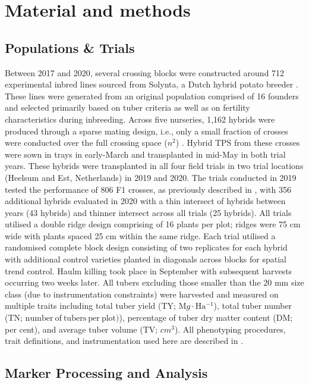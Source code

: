 \section{Material and methods}

\subsection{Populations \& Trials}

Between 2017 and 2020, several crossing blocks were constructed around 712 experimental inbred lines sourced from Solynta, a Dutch hybrid potato breeder \cite{Lindhout2018}. These lines were generated from an original population comprised of 16 founders and selected primarily based on tuber criteria as well as on fertility characteristics during inbreeding. Across five nurseries, 1,162 hybrids were produced through a sparse mating design, i.e., only a small fraction of crosses were conducted over the full crossing space (\(n^2\)) \cite{Wang2020}. Hybrid TPS from these crosses were sown in trays in early-March and transplanted in mid-May in both trial years. These hybrids were transplanted in all four field trials in two trial locations (Heelsum and Est, Netherlands) in 2019 and 2020. The trials conducted in 2019 tested the performance of 806 F1 crosses, as previously described in \cite{Adams2022}, with 356 additional hybrids evaluated in 2020 with a thin intersect of hybrids between years (43 hybrids) and thinner intersect across all trials (25 hybrids). All trials utilised a double ridge design comprising of 16 plants per plot; ridges were 75 cm wide with plants spaced 25 cm within the same ridge. Each trial utilised a randomised complete block design consisting of two replicates for each hybrid with additional control varieties planted in diagonals across blocks for spatial trend control. Haulm killing took place in September with subsequent harvests occurring two weeks later. All tubers excluding those smaller than the 20 mm size class (due to instrumentation constraints) were harvested and measured on multiple traits including total tuber yield (TY; \(\mathrm Mg \cdot \mathrm{Ha^{-1}}\)), total tuber number (TN; \(\mathrm{number~of~tubers~per~plot)}\)), percentage of tuber dry matter content (DM; per cent), and average tuber volume (TV; \(cm^3\)). All phenotyping procedures, trait definitions, and instrumentation used here are described in \cite{Stockem2020}.

\subsection{Marker Processing and Analysis}

